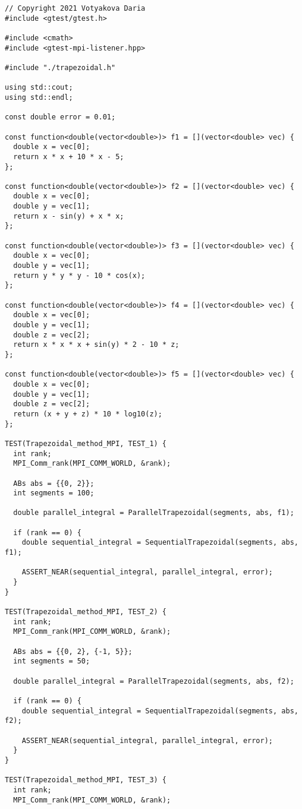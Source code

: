 \documentclass{report}
\begin{document}
\begin{lstlisting}
// Copyright 2021 Votyakova Daria
#include <gtest/gtest.h>

#include <cmath>
#include <gtest-mpi-listener.hpp>

#include "./trapezoidal.h"

using std::cout;
using std::endl;

const double error = 0.01;

const function<double(vector<double>)> f1 = [](vector<double> vec) {
  double x = vec[0];
  return x * x + 10 * x - 5;
};

const function<double(vector<double>)> f2 = [](vector<double> vec) {
  double x = vec[0];
  double y = vec[1];
  return x - sin(y) + x * x;
};

const function<double(vector<double>)> f3 = [](vector<double> vec) {
  double x = vec[0];
  double y = vec[1];
  return y * y * y - 10 * cos(x);
};

const function<double(vector<double>)> f4 = [](vector<double> vec) {
  double x = vec[0];
  double y = vec[1];
  double z = vec[2];
  return x * x * x + sin(y) * 2 - 10 * z;
};

const function<double(vector<double>)> f5 = [](vector<double> vec) {
  double x = vec[0];
  double y = vec[1];
  double z = vec[2];
  return (x + y + z) * 10 * log10(z);
};

TEST(Trapezoidal_method_MPI, TEST_1) {
  int rank;
  MPI_Comm_rank(MPI_COMM_WORLD, &rank);

  ABs abs = {{0, 2}};
  int segments = 100;

  double parallel_integral = ParallelTrapezoidal(segments, abs, f1);

  if (rank == 0) {
    double sequential_integral = SequentialTrapezoidal(segments, abs, f1);

    ASSERT_NEAR(sequential_integral, parallel_integral, error);
  }
}

TEST(Trapezoidal_method_MPI, TEST_2) {
  int rank;
  MPI_Comm_rank(MPI_COMM_WORLD, &rank);

  ABs abs = {{0, 2}, {-1, 5}};
  int segments = 50;

  double parallel_integral = ParallelTrapezoidal(segments, abs, f2);

  if (rank == 0) {
    double sequential_integral = SequentialTrapezoidal(segments, abs, f2);

    ASSERT_NEAR(sequential_integral, parallel_integral, error);
  }
}

TEST(Trapezoidal_method_MPI, TEST_3) {
  int rank;
  MPI_Comm_rank(MPI_COMM_WORLD, &rank);


\end{lstlisting}
\end{document}
